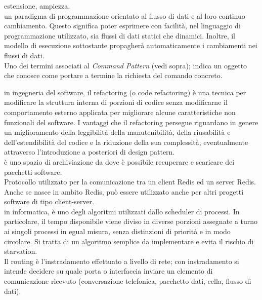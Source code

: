 \documentclass{scalatekids-article}
\begin{document}
   estensione, ampiezza.
  \\

   un paradigma di programmazione orientato al flusso di dati e al loro continuo cambiamento.
  Questo significa poter esprimere con facilità, nel linguaggio di programmazione utilizzato, sia flussi di dati statici che dinamici.
  Inoltre, il modello di esecuzione sottostante propagherà automaticamente i cambiamenti nei flussi di dati.
  \\

   Uno dei termini associati al \textit{Command Pattern} (vedi sopra); indica un oggetto che conosce come portare a termine la richiesta del comando concreto.

   in ingegneria del software, il refactoring (o code refactoring) è una tecnica per modificare la struttura interna di porzioni di codice senza modificarne il comportamento esterno applicata per migliorare alcune caratteristiche non funzionali del software.
  I vantaggi che il refactoring persegue riguardano in genere un miglioramento della leggibilità della manutenibilità, della riusabilità e dell'estendibilità del codice e la riduzione della sua complessità, eventualmente attraverso l'introduzione a posteriori di design pattern.
  \\

   è uno spazio di archiviazione da dove è possibile recuperare e scaricare dei pacchetti software.
  \\

   Protocollo utilizzato per la comunicazione tra un client Redis ed un server Redis. Anche se nasce in ambito Redis, può essere utilizzato anche per altri progetti software di tipo client-server.
  \\
  
   in informatica, è uno degli algoritmi utilizzati dallo scheduler di processi.
  In particolare, il tempo disponibile viene diviso in diverse porzioni assegnate a turno ai singoli processi in egual misura, senza distinzioni di priorità e in modo circolare.
  Si tratta di un algoritmo semplice da implementare e evita il rischio di starvation.
  \\

   Il routing è l'instradamento effettuato a livello di rete; con instradamento si intende decidere su quale porta o interfaccia inviare un elemento di comunicazione ricevuto (conversazione telefonica, pacchetto dati, cella, flusso di dati).
  \\
\end{document}

